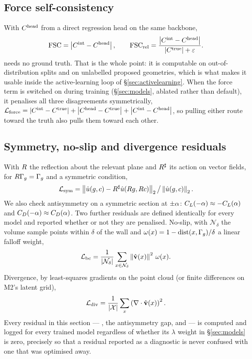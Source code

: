 \documentclass[11pt,a4paper]{article}
\begin{document}
\subsection{Force self-consistency}
With $C^{\text{head}}$ from a direct regression head on the same backbone,
\begin{equation}
  \mathrm{FSC} = \left\lvert C^{\text{int}} - C^{\text{head}} \right\rvert, \qquad
  \mathrm{FSC}_{\text{rel}} = \frac{\left\lvert C^{\text{int}} - C^{\text{head}} \right\rvert}{\left\lvert C^{\text{true}} \right\rvert + \varepsilon}.
\end{equation}
\FSC{} needs no ground truth. That is the whole point: it is computable on
out-of-distribution splits and on unlabelled proposed geometries, which is what
makes it usable inside the active-learning loop of \S\ref{sec:activelearning}.
When the force term is switched on during training (\S\ref{sec:models}, ablated
rather than default), it penalises all three disagreements symmetrically,
$\mathcal{L}_{\text{force}} = \left\lvert C^{\text{int}} - C^{\text{true}} \right\rvert + \left\lvert C^{\text{head}} - C^{\text{true}} \right\rvert + \left\lvert C^{\text{int}} - C^{\text{head}} \right\rvert$,
so pulling either route toward the truth also pulls them toward each other.

\subsection{Symmetry, no-slip and divergence residuals}
With $R$ the reflection about the relevant plane and $R^{\sharp}$ its action
on vector fields, for $R\Gamma_{g} = \Gamma_{g}$ and a symmetric condition,
\begin{equation}
  \mathcal{L}_{\text{sym}} = \left\lVert \hat{u}(g,c) - R^{\sharp} \hat{u}(R g, R c) \right\rVert_2
             \big/ \left\lVert \hat{u}(g,c) \right\rVert_2 .
\end{equation}
We also check antisymmetry on a symmetric section at $\pm\alpha$:
$C_L(-\alpha) \approx -C_L(\alpha)$ and $C_D(-\alpha) \approx C_D(\alpha)$. Two further
residuals are defined identically for every model and reported whether or not
they are penalised. No-slip, with $\mathcal{N}_\delta$ the volume sample points
within $\delta$ of the wall and $\omega(x) = 1 - \mathrm{dist}(x,\Gamma_{g})/\delta$ a
linear falloff weight,
\begin{equation}
  \mathcal{L}_{\text{bc}} = \frac{1}{\left\lvert \mathcal{N}_\delta \right\rvert}
            \sum_{x \in \mathcal{N}_\delta} \left\lVert \hat{\mathbf{v}}(x) \right\rVert^2 \, \omega(x) .
\end{equation}
Divergence, by least-squares gradients on the point cloud (or finite differences
on M2's latent grid),
\begin{equation}
  \mathcal{L}_{\text{div}} = \frac{1}{\left\lvert \mathcal{X} \right\rvert} \sum_{x} \left(\nabla \cdot \hat{\mathbf{v}}(x)\right)^2 .
\end{equation}
Every residual in this section --- \Losssym, the antisymmetry gap, \Lossbc{} and
\Lossdiv{} --- is computed and logged for every trained model regardless of
whether its $\lambda$ weight in \S\ref{sec:models} is zero, precisely so that a
residual reported as a diagnostic is never confused with one that was optimised
away.
\end{document}
